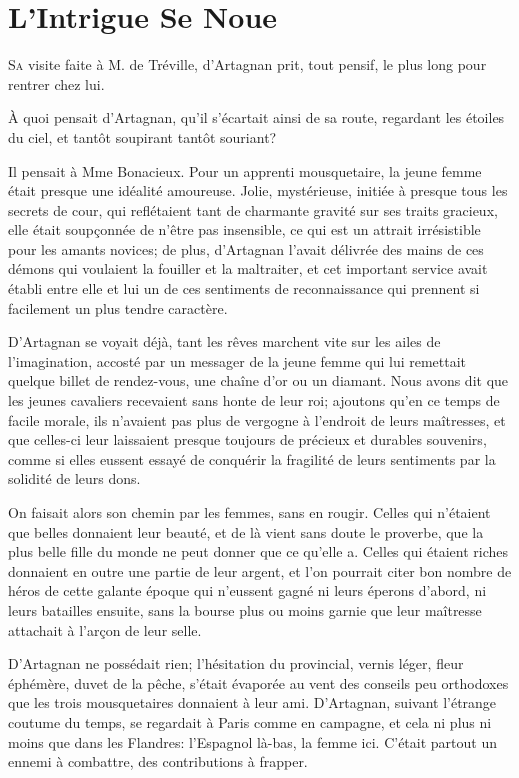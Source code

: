 
\chapter{L'Intrigue Se Noue}

\lettrine{S}{a} visite faite à M. de Tréville, d'Artagnan prit, tout pensif, le plus long pour rentrer chez lui. 

\zz
À quoi pensait d'Artagnan, qu'il s'écartait ainsi de sa route, regardant les étoiles du ciel, et tantôt soupirant tantôt souriant? 

Il pensait à Mme Bonacieux. Pour un apprenti mousquetaire, la jeune femme était presque une idéalité amoureuse. Jolie, mystérieuse, initiée à presque tous les secrets de cour, qui reflétaient tant de charmante gravité sur ses traits gracieux, elle était soupçonnée de n'être pas insensible, ce qui est un attrait irrésistible pour les amants novices; de plus, d'Artagnan l'avait délivrée des mains de ces démons qui voulaient la fouiller et la maltraiter, et cet important service avait établi entre elle et lui un de ces sentiments de reconnaissance qui prennent si facilement un plus tendre caractère. 

D'Artagnan se voyait déjà, tant les rêves marchent vite sur les ailes de l'imagination, accosté par un messager de la jeune femme qui lui remettait quelque billet de rendez-vous, une chaîne d'or ou un diamant. Nous avons dit que les jeunes cavaliers recevaient sans honte de leur roi; ajoutons qu'en ce temps de facile morale, ils n'avaient pas plus de vergogne à l'endroit de leurs maîtresses, et que celles-ci leur laissaient presque toujours de précieux et durables souvenirs, comme si elles eussent essayé de conquérir la fragilité de leurs sentiments par la solidité de leurs dons. 

On faisait alors son chemin par les femmes, sans en rougir. Celles qui n'étaient que belles donnaient leur beauté, et de là vient sans doute le proverbe, que la plus belle fille du monde ne peut donner que ce qu'elle a. Celles qui étaient riches donnaient en outre une partie de leur argent, et l'on pourrait citer bon nombre de héros de cette galante époque qui n'eussent gagné ni leurs éperons d'abord, ni leurs batailles ensuite, sans la bourse plus ou moins garnie que leur maîtresse attachait à l'arçon de leur selle. 

D'Artagnan ne possédait rien; l'hésitation du provincial, vernis léger, fleur éphémère, duvet de la pêche, s'était évaporée au vent des conseils peu orthodoxes que les trois mousquetaires donnaient à leur ami. D'Artagnan, suivant l'étrange coutume du temps, se regardait à Paris comme en campagne, et cela ni plus ni moins que dans les Flandres: l'Espagnol là-bas, la femme ici. C'était partout un ennemi à combattre, des contributions à frapper. 

